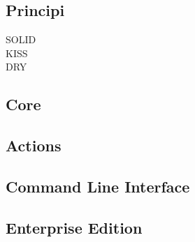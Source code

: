 \subsection{Principi}
SOLID\\
KISS\\
DRY
\subsection{Core}
\subsection{Actions}
\subsection{Command Line Interface}
\subsection{Enterprise Edition}